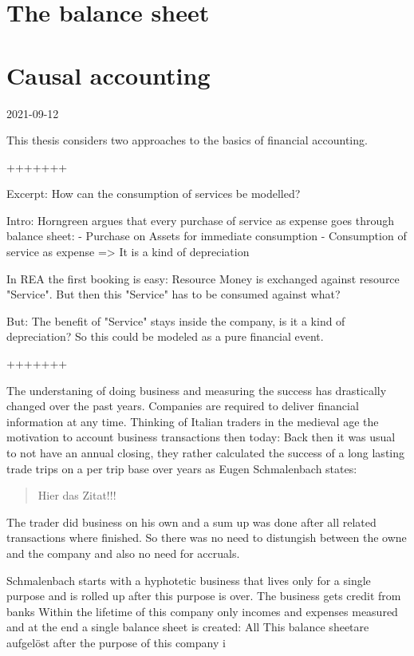 \section{The balance sheet}


\section{Causal accounting}

2021-09-12

This thesis considers two approaches to the basics of financial accounting.

+++++++

Excerpt: How can the consumption of services be modelled?

Intro: Horngreen argues that every purchase of service as expense goes through balance sheet:
- Purchase on Assets for immediate consumption
- Consumption of service as expense
=> It is a kind of depreciation

In REA the first booking is easy:
Resource Money is exchanged against resource "Service".
But then this "Service" has to be consumed against what?

But: The benefit of "Service" stays inside the company, is it a kind of depreciation?
So this could be modeled as a pure financial event.

+++++++



The understaning of doing business and measuring the success has drastically changed over the past years.
Companies are required to deliver financial information at any time.
Thinking of Italian traders in the medieval age the motivation to account business transactions then today:
Back then it was usual to not have an annual closing, they rather calculated the success of a long lasting trade trips on a per trip base over years as Eugen Schmalenbach states:

\blockquote[\cite{schmalenbach1962}][]{Hier das Zitat!!!}

The trader did business on his own and a sum up was done after all related transactions where finished.
So there was no need to distungish between the owne and the company and also no need for accruals.

Schmalenbach starts with a hyphotetic business that lives only for a single purpose and is rolled up after this purpose is over.
The business gets credit from banks 
Within the lifetime of this company only incomes and expenses measured and at the end a single balance sheet is created:
All 
This balance sheetare aufgelöst after the purpose of this company i

